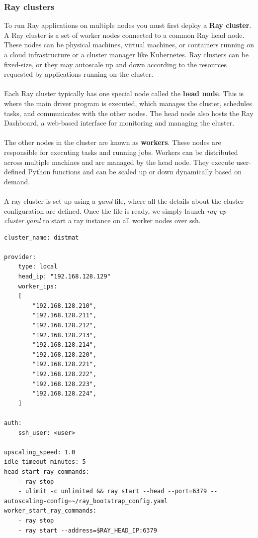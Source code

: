 \subsubsection{Ray clusters}
To run Ray applications on multiple nodes you must first deploy a \textbf{Ray cluster}. A Ray cluster is a set of worker nodes connected to a common Ray head node. These nodes can be physical machines, virtual machines, or containers running on a cloud infrastructure or a cluster manager like Kubernetes. Ray clusters can be fixed-size, or they may autoscale up and down according to the resources requested by applications running on the cluster.
\\\\
Each Ray cluster typically has one special node called the \textbf{head node}. This is where the main driver program is executed, which manages the cluster, schedules tasks, and communicates with the other nodes. The head node also hosts the Ray Dashboard, a web-based interface for monitoring and managing the cluster.
\\\\
The other nodes in the cluster are known as \textbf{workers}. These nodes are responsible for executing tasks and running jobs. Workers can be distributed across multiple machines and are managed by the head node. They execute user-defined Python functions and can be scaled up or down dynamically based on demand.
\\\\
A ray cluster is set up using a \textit{yaml} file, where all the details about the cluster configuration are defined. Once the file is ready, we simply launch \textit{ray up cluster.yaml} to start a ray instance on all worker nodes over ssh.
\begin{lstlisting}[caption={cluster.yaml}]
cluster_name: distmat

provider:
    type: local
    head_ip: "192.168.128.129"
    worker_ips:
    [
        "192.168.128.210",
        "192.168.128.211",
        "192.168.128.212",
        "192.168.128.213",
        "192.168.128.214",
        "192.168.128.220",
        "192.168.128.221",
        "192.168.128.222",
        "192.168.128.223",
        "192.168.128.224",
    ]

auth:
    ssh_user: <user>

upscaling_speed: 1.0
idle_timeout_minutes: 5
head_start_ray_commands:
    - ray stop
    - ulimit -c unlimited && ray start --head --port=6379 --autoscaling-config=~/ray_bootstrap_config.yaml
worker_start_ray_commands:
    - ray stop
    - ray start --address=$RAY_HEAD_IP:6379

\end{lstlisting}

